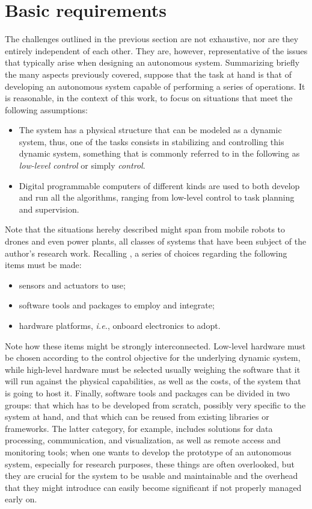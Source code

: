 \section{Basic requirements}
\label{sec:prb_requirements}
The challenges outlined in the previous section are not exhaustive, nor are they entirely independent of each other. They are, however, representative of the issues that typically arise when designing an autonomous system. Summarizing briefly the many aspects previously covered, suppose that the task at hand is that of developing an autonomous system capable of performing a series of operations. It is reasonable, in the context of this work, to focus on situations that meet the following assumptions:
\begin{itemize}
  \item The system has a physical structure that can be modeled as a dynamic system, thus, one of the tasks consists in stabilizing and controlling this dynamic system, something that is commonly referred to in the following as \emph{low-level control} or simply \emph{control}.
  \item Digital programmable computers of different kinds are used to both develop and run all the algorithms, ranging from low-level control to task planning and supervision.
\end{itemize}
Note that the situations hereby described might span from mobile robots to drones and even power plants, all classes of systems that have been subject of the author's research work. Recalling , a series of choices regarding the following items must be made:
\begin{itemize}
  \item sensors and actuators to use;
  \item software tools and packages to employ and integrate;
  \item hardware platforms, \emph{i.e.}, onboard electronics to adopt.
\end{itemize}
Note how these items might be strongly interconnected. Low-level hardware must be chosen according to the control objective for the underlying dynamic system, while high-level hardware must be selected usually weighing the software that it will run against the physical capabilities, as well as the costs, of the system that is going to host it. Finally, software tools and packages can be divided in two groups: that which has to be developed from scratch, possibly very specific to the system at hand, and that which can be reused from existing libraries or frameworks. The latter category, for example, includes solutions for data processing, communication, and visualization, as well as remote access and monitoring tools; when one wants to develop the prototype of an autonomous system, especially for research purposes, these things are often overlooked, but they are crucial for the system to be usable and maintainable and the overhead that they might introduce can easily become significant if not properly managed early on.

